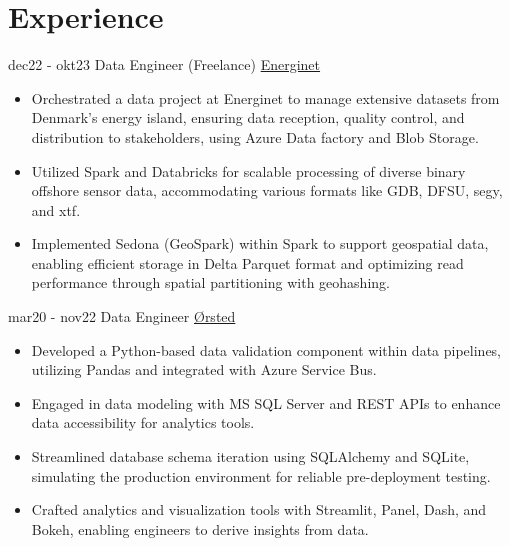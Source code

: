 \documentclass[letterpaper]{twentysecondcv} %
\begin{document}
\makeprofile %



\section{Experience}

\begin{twenty} %

\twentyitem
    	{dec22 - okt23}
		{}
        {Data Engineer (Freelance)}
        {\href{https://www.energinet.dk/}{Energinet}}
        {}
        {
        \begin{itemize}
            \item Orchestrated a data project at Energinet to manage extensive datasets from Denmark's energy island, ensuring data reception, quality control, and distribution to stakeholders, using Azure Data factory and Blob Storage.
            \item Utilized Spark and Databricks for scalable processing of diverse binary offshore sensor data, accommodating various formats like GDB, DFSU, segy, and xtf.
            \item Implemented Sedona (GeoSpark) within Spark to support geospatial data, enabling efficient storage in Delta Parquet format and optimizing read performance through spatial partitioning with geohashing.
\end{itemize}
\bigskip %
}
 
\twentyitem
    	{mar20 - nov22}
		{}
        { Data Engineer}
        {\href{https://orsted.com/}{Ørsted}}
        {}
        {
          \begin{itemize}
    \item Developed a Python-based data validation component within data pipelines, utilizing Pandas and integrated with Azure Service Bus.
    \item Engaged in data modeling with MS SQL Server and REST APIs to enhance data accessibility for analytics tools.
    \item Streamlined database schema iteration using SQLAlchemy and SQLite, simulating the production environment for reliable pre-deployment testing.
    \item Crafted analytics and visualization tools with Streamlit, Panel, Dash, and Bokeh, enabling engineers to derive insights from data.
\end{itemize}
\bigskip %
}


\end{twenty}
\end{document}
